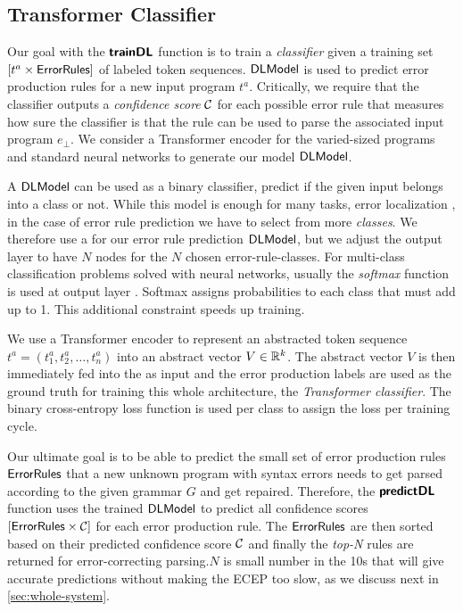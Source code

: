 \subsection{Transformer Classifier}
\label{sec:seq-classifiers:location-rank}

Our goal with the $\bm{\mathsf{trainDL}}$ function is to train a \emph{classifier} given a
training set $[t^a \times \mathsf{ErrorRules}]$ of labeled token sequences.
$\mathsf{DLModel}$ is used to predict error production rules for a new input program
$t^a$. Critically, we require that the classifier outputs a \emph{confidence
score} $\mathcal{C}$ for each possible error rule that measures how sure the
classifier is that the rule can be used to parse the associated input program
$e_{\bot}$. We consider a Transformer encoder for the varied-sized programs and
standard neural networks to generate our model $\mathsf{DLModel}$.

%
A \dnn $\mathsf{DLModel}$ can be used as a binary classifier, \ie predict if the given
input belongs into a class or not. While this model is enough for many tasks,
\eg error localization \citep{Sakkas_2020}, in the case of error rule prediction
we have to select from more \emph{classes}. We therefore use a \dnn for our
error rule prediction $\mathsf{DLModel}$, but we adjust the output layer to have $N$ nodes
for the $N$ chosen error-rule-classes. For multi-class classification problems
solved with neural networks, usually the \emph{softmax} function is used at
output layer \citep{Goodfellow-et-al-2016, Bishop-book-2006}. Softmax assigns
probabilities to each class that must add up to 1. This additional constraint
speeds up training.

%
We use a Transformer encoder to represent an abstracted token sequence $t^a =
(t^a_1, t^a_2, \dots, t^a_n)$ into an abstract vector $V \in \mathbb{R}^k$. The abstract
vector $V$ is then immediately fed into the \dnn as input and the error
production labels are used as the ground truth for training this whole
architecture, \ie the \emph{Transformer classifier}. The binary cross-entropy
loss function is used per class to assign the loss per training cycle.

%
Our ultimate goal is to be able to predict the small set of error production
rules $\mathsf{ErrorRules}$ that a new unknown program with syntax errors needs to
get parsed according to the given grammar $G$ and get repaired. Therefore, the
$\bm{\mathsf{predictDL}}$ function uses the trained $\mathsf{DLModel}$ to predict all confidence
scores $[\mathsf{ErrorRules} \times \mathcal{C}]$ for each error production rule. The
$\mathsf{ErrorRules}$ are then sorted based on their predicted confidence score
$\mathcal{C}$ and finally the \emph{top-N} rules are returned for error-correcting
parsing.$N$ is small number in the 10s that will give accurate predictions
without making the ECEP too slow, as we discuss next in
\autoref{sec:whole-system}.

